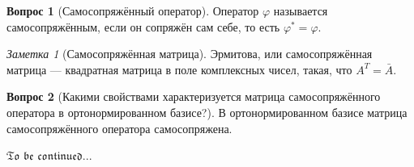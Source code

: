 \documentclass[a4paper,11pt]{article}
\theoremstyle{remark}
\newtheorem*{note}{Заметка}
\theoremstyle{definition}
\newtheorem{question}{Вопрос}
\begin{document}
\begin{question}[Самосопряжённый оператор]
Оператор \(\varphi\) называется самосопряжённым, если он сопряжён сам себе, то есть \(\varphi^* = \varphi\).
\end{question}


\begin{note}[Самосопряжённая матрица]
Эрмитова, или самосопряжённая матрица --- квадратная матрица в поле комплексных чисел, такая, что \(A^T = \bar{A}\).
\end{note}


\begin{question}[Какими свойствами характеризуется матрица самосопряжённого оператора в ортонормированном базисе?]
В ортонормированном базисе матрица самосопряжённого оператора самосопряжена.
\end{question}


\Huge
\(\mathfrak{To}\) \(\mathfrak{be}\) \(\mathfrak{continued...}\) 
\end{document}
